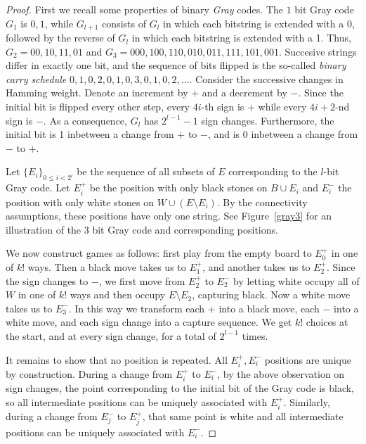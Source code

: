 \documentclass{article}
\begin{document}
\begin{proof}
First we recall some properties of binary {\em Gray} codes.
The $1$ bit Gray code $G_1$ is $0,1$, while $G_{l+1}$ consists of $G_l$
in which each bitstring is extended with a 0,
followed by the reverse of $G_l$
in which each bitstring is extended with a 1.
Thus, $G_2 = 00,10,11,01$ and $G_3=000,100,110,010,011,111,101,001$.
Succesive strings differ in exactly one bit, and the sequence of bits
flipped is the so-called {\em binary carry schedule}
$0,1,0,2,0,1,0,3,0,1,0,2,\ldots$.
Consider the successive changes in Hamming weight.
Denote an increment by $+$ and a decrement by $-$.
Since the initial bit is flipped every other step,
every $4i$-th sign is $+$ while every $4i+2$-nd sign is $-$.
As a consequence, $G_l$ has $2^{l-1}-1$ sign changes.
Furthermore, the initial bit is 1 inbetween a change from $+$ to $-$,
and is 0 inbetween a change from $-$ to $+$.

Let $\{E_i\}_{0\leq i<2^l}$ be the sequence of all subsets of $E$
corresponding to the $l$-bit Gray code. 
Let $E_i^+$ be the position with only black stones on $B \cup E_i$ and
$E_i^-$ the position with only white stones on $W \cup (E \setminus E_i)$.
By the connectivity assumptions, these positions have only one string.
See Figure~\ref{gray3} for an illustration of the 3 bit Gray code
and corresponding positions.

We now construct games as follows: first play from the empty board to
$E_0^+$ in one of $k!$ ways. Then a black move takes us to
$E_1^+$, and another takes us to $E_2^+$. Since the sign changes to $-$,
we first move from $E_2^+$ to $E_2^-$ by letting white occupy all of $W$
in one of $k!$ ways and then occupy $E \setminus E_2$, capturing black.
Now a white
move takes us to $E_3^-$. In this way we transform each $+$ into a
black move, each $-$ into a white move, and each sign change into
a capture sequence. We get $k!$ choices at the start, and at
every sign change, for a total of $2^{l-1}$ times.

It remains to show that no position is repeated.
All $E_i^+,E_i^-$ positions are unique by construction.
During a change from $E_i^+$ to $E_i^-$, by the above observation on
sign changes, the point corresponding to the initial bit of
the Gray code is black, so all
intermediate positions can be uniquely associated with $E_i^+$.
Similarly, during a change from $E_j^-$ to $E_j^+$, that same point is
white and all intermediate positions can be uniquely associated
with $E_i^-$.
\end{proof}
\end{document}
